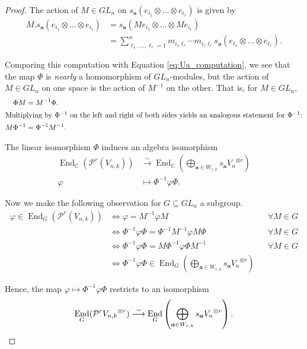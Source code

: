 \documentclass[ALCO,Unicode,published]{cedram}
\newcommand{\C}{\mathbb{C}}
\newcommand{\PP}{\mathcal{P}}
\newcommand{\bfa}{{\boldsymbol{a}}}
\DeclareMathOperator{\End}{End}
\begin{document}
\begin{proof}
The action of $M\in GL_n$ on $s_\bfa(e_{i_1}\otimes\dots\otimes e_{i_r})$ is given by \begin{align*}
    M.s_\bfa(e_{i_1}\otimes\dots\otimes e_{i_r})&=s_\bfa(Me_{i_1}\otimes\dots\otimes M e_{i_r})\\
    &=\sum_{\ell_1,\dots,\ell_r=1}^n m_{i_1\ell_r}\cdots m_{i_r\ell_r}s_\bfa(e_{\ell_1}\otimes\dots\otimes e_{\ell_r}).
\end{align*}

Comparing this computation with Equation \ref{eq:Ua_computation}, we see that the map $\Phi$ is \textit{nearly} a homomorphism of $GL_n$-modules, but the action of $M\in GL_n$ on one space is the action of $M^{-1}$ on the other. That is, for $M\in GL_n$, \begin{align*}
        \Phi M &= M^{-1}\Phi.\\
        \intertext{Multiplying by $\Phi^{-1}$ on the left and right of both sides yields an analogous statement for $\Phi^{-1}$:}
        M\Phi^{-1}&=\Phi^{-1}M^{-1}.
    \end{align*}


    The linear isomorphism $\Phi$ induces an algebra isomorphism \begin{align*}
        \End_\C(\PP^r(V_{n,k}))&\stackrel{\sim}{\longrightarrow}\End_\C\left(\bigoplus_{\bfa\in W_{r,k}}s_\bfa{V_n}^{\otimes r}\right)\\
        \varphi&\longmapsto \Phi^{-1}\varphi\Phi.
    \end{align*}
    
     Now we make the following observation for $G\subseteq GL_n$ a subgroup. \begin{align*}
        \varphi\in\End_G(\PP^r(V_{n,k}))&\iff \varphi=M^{-1}\varphi M && \forall M\in G\\
        &\iff \Phi^{-1}\varphi\Phi=\Phi^{-1} M^{-1} \varphi M \Phi && \forall M\in G\\
        &\iff \Phi^{-1}\varphi\Phi=M\Phi^{-1}\varphi\Phi M^{-1} && \forall M\in G\\
        &\iff \Phi^{-1}\varphi\Phi\in\End_G\left(\bigoplus_{\bfa\in W_{r,k}}s_\bfa{V_n}^{\otimes r}\right)
    \end{align*}

    Hence, the map $\varphi\mapsto \Phi^{-1}\varphi\Phi$ restricts to an isomorphism\[\End_G(\PP^r{V_{n,k}}^{\otimes r})\stackrel{\sim}{\longrightarrow}\End_G\left(\bigoplus_{\bfa\in W_{r,k}}s_\bfa {V_n}^{\otimes r}\right). \qedhere\]
\end{proof}
\end{document}
